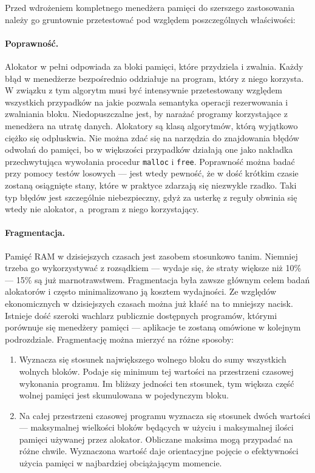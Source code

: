 \documentclass[12pt,a4paper,titlepage,twoside]{mwart}
\begin{document}
Przed wdrożeniem kompletnego menedżera pamięci do szerszego zastosowania należy
go gruntownie przetestować pod względem poszczególnych właściwości:

\paragraph{Poprawność.} Alokator w pełni odpowiada za bloki pamięci, które
przydziela i zwalnia. Każdy błąd w menedżerze bezpośrednio oddziałuje na
program, który z niego korzysta. W związku z tym algorytm musi być intensywnie
przetestowany względem wszystkich przypadków na jakie pozwala semantyka
operacji rezerwowania i zwalniania bloku. Niedopuszczalne jest, by narażać
programy korzystające z menedżera na utratę danych. Alokatory są klasą
algorytmów, którą wyjątkowo ciężko się odpluskwia. Nie można zdać się na
narzędzia do znajdowania błędów odwołań do pamięci, bo w większości przypadków
działają one jako nakładka przechwytująca wywołania procedur \texttt{malloc} i
\texttt{free}. Poprawność można badać przy pomocy testów losowych --- jest wtedy
pewność, że w dość krótkim czasie zostaną osiągnięte stany, które w praktyce
zdarzają się niezwykle rzadko. Taki typ błędów jest szczególnie niebezpieczny,
gdyż za usterkę z reguły obwinia się wtedy nie alokator, a~program z niego
korzystający.

\paragraph{Fragmentacja.} Pamięć RAM w dzisiejszych czasach jest zasobem
stosunkowo tanim. Niemniej trzeba go wykorzystywać z rozsądkiem --- wydaje się,
że straty większe niż 10\% --- 15\% są już marnotrawstwem. Fragmentacja była
zawsze głównym celem badań alokatorów i często minimalizowano ją kosztem
wydajności. Ze względów ekonomicznych w dzisiejszych czasach można już kłaść na
to mniejszy nacisk. Istnieje dość szeroki wachlarz publicznie dostępnych
programów, którymi porównuje się menedżery pamięci --- aplikacje te zostaną
omówione w kolejnym podrozdziale. Fragmentację można mierzyć na różne sposoby:

\begin{enumerate}

\item Wyznacza się stosunek największego wolnego bloku do sumy wszystkich
wolnych bloków. Podaje się minimum tej wartości na przestrzeni czasowej
wykonania programu. Im bliższy jedności ten stosunek, tym większa część wolnej
pamięci jest skumulowana w pojedynczym bloku.

\vspace{1ex}

\item Na całej przestrzeni czasowej programu wyznacza się stosunek dwóch
wartości --- maksymalnej wielkości bloków będących w użyciu i maksymalnej ilości
pamięci używanej przez alokator. Obliczane maksima mogą przypadać na różne
chwile. Wyznaczona wartość daje orientacyjne pojęcie o efektywności użycia
pamięci w najbardziej obciążającym momencie.

\end{enumerate}
\end{document}
